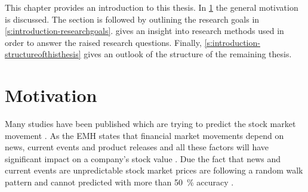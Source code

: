 



This chapter provides an introduction to this thesis.
In \cref{s:introduction-motivation} the general motivation is discussed.
The section is followed by outlining the research goals in \cref{s:introduction-researchgoals}.
 gives an insight into research methods used in order to answer the raised research questions.
Finally, \cref{s:introduction-structureofthisthesis} gives an outlook of the structure of the remaining thesis.

\section{Motivation}
\label{s:introduction-motivation}

Many studies have been published which are trying to predict the stock market movement .
As the \ac{EMH} states that financial market movements depend on news, current events and product releases and all these factors will have significant impact on a company's stock value
\citep{fama1965behavior}.
Due the fact that news and current events are unpredictable stock market prices are following a random walk pattern and cannot predicted with more than \SI{50}{\percent} accuracy
\citep{Pagolu2016a}.


